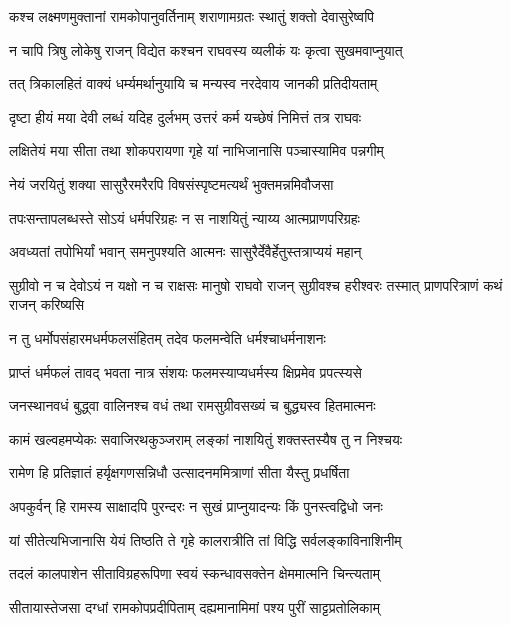 \twolineshloka
{कश्च लक्ष्मणमुक्तानां रामकोपानुवर्तिनाम्}
{शराणामग्रतः स्थातुं शक्तो देवासुरेष्वपि} %

\twolineshloka
{न चापि त्रिषु लोकेषु राजन् विद्येत कश्चन}
{राघवस्य व्यलीकं यः कृत्वा सुखमवाप्नुयात्} %

\twolineshloka
{तत् त्रिकालहितं वाक्यं धर्म्यमर्थानुयायि च}
{मन्यस्व नरदेवाय जानकी प्रतिदीयताम्} %

\twolineshloka
{दृष्टा हीयं मया देवी लब्धं यदिह दुर्लभम्}
{उत्तरं कर्म यच्छेषं निमित्तं तत्र राघवः} %

\twolineshloka
{लक्षितेयं मया सीता तथा शोकपरायणा}
{गृहे यां नाभिजानासि पञ्चास्यामिव पन्नगीम्} %

\twolineshloka
{नेयं जरयितुं शक्या सासुरैरमरैरपि}
{विषसंस्पृष्टमत्यर्थं भुक्तमन्नमिवौजसा} %

\twolineshloka
{तपःसन्तापलब्धस्ते सोऽयं धर्मपरिग्रहः}
{न स नाशयितुं न्याय्य आत्मप्राणपरिग्रहः} %

\twolineshloka
{अवध्यतां तपोभिर्यां भवान् समनुपश्यति}
{आत्मनः सासुरैर्देवैर्हेतुस्तत्राप्ययं महान्} %

\threelineshloka
{सुग्रीवो न च देवोऽयं न यक्षो न च राक्षसः}
{मानुषो राघवो राजन् सुग्रीवश्च हरीश्वरः}
{तस्मात् प्राणपरित्राणं कथं राजन् करिष्यसि} %

\twolineshloka
{न तु धर्मोपसंहारमधर्मफलसंहितम्}
{तदेव फलमन्वेति धर्मश्चाधर्मनाशनः} %

\twolineshloka
{प्राप्तं धर्मफलं तावद् भवता नात्र संशयः}
{फलमस्याप्यधर्मस्य क्षिप्रमेव प्रपत्स्यसे} %

\twolineshloka
{जनस्थानवधं बुद्ध्वा वालिनश्च वधं तथा}
{रामसुग्रीवसख्यं च बुद्ध्यस्व हितमात्मनः} %

\twolineshloka
{कामं खल्वहमप्येकः सवाजिरथकुञ्जराम्}
{लङ्कां नाशयितुं शक्तस्तस्यैष तु न निश्चयः} %

\twolineshloka
{रामेण हि प्रतिज्ञातं हर्यृक्षगणसन्निधौ}
{उत्सादनममित्राणां सीता यैस्तु प्रधर्षिता} %

\twolineshloka
{अपकुर्वन् हि रामस्य साक्षादपि पुरन्दरः}
{न सुखं प्राप्नुयादन्यः किं पुनस्त्वद्विधो जनः} %

\twolineshloka
{यां सीतेत्यभिजानासि येयं तिष्ठति ते गृहे}
{कालरात्रीति तां विद्धि सर्वलङ्काविनाशिनीम्} %

\twolineshloka
{तदलं कालपाशेन सीताविग्रहरूपिणा}
{स्वयं स्कन्धावसक्तेन क्षेममात्मनि चिन्त्यताम्} %

\twolineshloka
{सीतायास्तेजसा दग्धां रामकोपप्रदीपिताम्}
{दह्यमानामिमां पश्य पुरीं साट्टप्रतोलिकाम्} %


